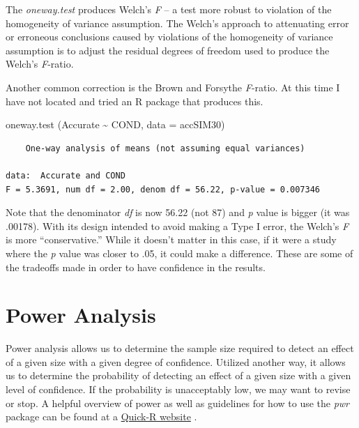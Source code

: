 \documentclass[
  english,
]{book}
\newenvironment{Shaded}{\begin{snugshade}}{\end{snugshade}}
\newcommand{\AttributeTok}[1]{\textcolor[rgb]{0.77,0.63,0.00}{#1}}
\newcommand{\FunctionTok}[1]{\textcolor[rgb]{0.00,0.00,0.00}{#1}}
\newcommand{\NormalTok}[1]{#1}
\newcommand{\SpecialCharTok}[1]{\textcolor[rgb]{0.00,0.00,0.00}{#1}}
\begin{document}
The \emph{oneway.test} produces Welch's \emph{F} -- a test more robust to violation of the homogeneity of variance assumption. The Welch's approach to attenuating error or erroneous conclusions caused by violations of the homogeneity of variance assumption is to adjust the residual degrees of freedom used to produce the Welch's \emph{F}-ratio.

Another common correction is the Brown and Forsythe \emph{F}-ratio. At this time I have not located and tried an R package that produces this.

\begin{Shaded}
\begin{Highlighting}[]
\FunctionTok{oneway.test}\NormalTok{ (Accurate }\SpecialCharTok{\textasciitilde{}}\NormalTok{ COND, }\AttributeTok{data =}\NormalTok{ accSIM30)}
\end{Highlighting}
\end{Shaded}

\begin{verbatim}
    One-way analysis of means (not assuming equal variances)

data:  Accurate and COND
F = 5.3691, num df = 2.00, denom df = 56.22, p-value = 0.007346
\end{verbatim}

Note that the denominator \emph{df} is now 56.22 (not 87) and \emph{p} value is bigger (it was .00178). With its design intended to avoid making a Type I error, the Welch's \emph{F} is more ``conservative.'' While it doesn't matter in this case, if it were a study where the \emph{p} value was closer to .05, it could make a difference. These are some of the tradeoffs made in order to have confidence in the results.

\hypertarget{power-analysis}{%
\section{Power Analysis}\label{power-analysis}}

Power analysis allows us to determine the sample size required to detect an effect of a given size with a given degree of confidence. Utilized another way, it allows us to determine the probability of detecting an effect of a given size with a given level of confidence. If the probability is unacceptably low, we may want to revise or stop. A helpful overview of power as well as guidelines for how to use the \emph{pwr} package can be found at a \href{https://www.statmethods.net/stats/power.html}{Quick-R website} \citep{kabacoff_power_2017}.
\end{document}
